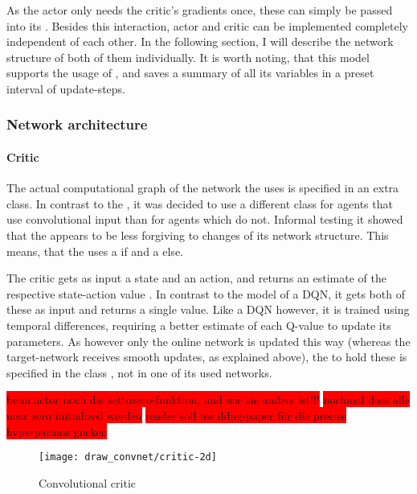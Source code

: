 As the actor only needs the critic's gradients once, these can simply be passed into its . Besides this interaction, actor and critic can be implemented completely independent of each other. In the following section, I will describe the network structure of both of them individually. It is worth noting, that this model supports the usage of , and saves a summary of all its variables in a preset interval of update-steps.

\subsubsection{Network architecture}

\paragraph{Critic}

The actual computational graph of the network the  uses is specified in an extra class. In contrast to the , it was decided to use a different class for agents that use convolutional input than for agents which do not. Informal testing it showed that the  appears to be less forgiving to changes of its network structure. This means, that the  uses a  if  and a  else.

The critic gets as input a state and an action, and returns an estimate of the respective state-action value . In contrast to the model of a DQN, it gets both of these as input and returns a single value. Like a DQN however, it is trained using temporal differences, requiring a better estimate of each Q-value to update its parameters. As however only the online network is updated this way (whereas the target-network receives smooth updates, as explained above), the  to hold these is specified in the class , not in one of its used networks.



\colorbox{red}{beim actor noch die settozero-funktion, und wie sie anders ist!!!}
\colorbox{red}{nochmal dass alle near zero initialized werden}
\colorbox{red}{reader soll ins ddpg-paper für die precise hyperparams gucken}

\begin{figure}[h]
	\centering 
	\texttt{[image: draw\_convnet/critic-2d]}
	\caption{Convolutional critic}
	\label{fig:2dcrit}
\end{figure}

